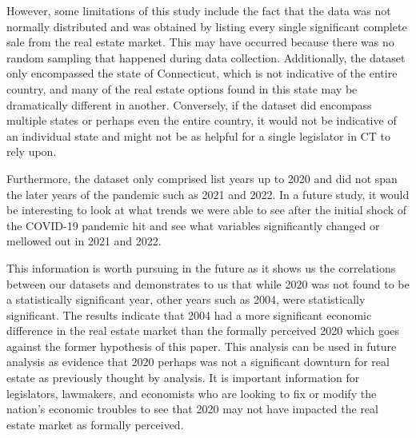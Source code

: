 \documentclass[12pt]{article}
\begin{document}
However, some limitations of this study include the fact that the data was not normally distributed and was obtained by listing every single significant complete sale from the real estate market. This may have occurred because there was no random sampling that happened during data collection. Additionally, the dataset only encompassed the state of Connecticut, which is not indicative of the entire country, and many of the real estate options found in this state may be dramatically different in another. Conversely, if the dataset did encompass multiple states or perhaps even the entire country, it would not be indicative of an individual state and might not be as helpful for a single legislator in CT to rely upon.

Furthermore, the dataset only comprised list years up to 2020 and did not span the later years of the pandemic such as 2021 and 2022. In a future study, it would be interesting to look at what trends we were able to see after the initial shock of the COVID-19 pandemic hit and see what variables significantly changed or mellowed out in 2021 and 2022.

This information is worth pursuing in the future as it shows us the correlations between our datasets and demonstrates to us that while 2020 was not found to be a statistically significant year, other years such as 2004, were statistically significant. The results indicate that 2004 had a more significant economic difference in the real estate market than the formally perceived 2020 which goes against the former hypothesis of this paper. This analysis can be used in future analysis as evidence that 2020 perhaps was not a significant downturn for real estate as previously thought by analysis. It is important information for legislators, lawmakers, and economists who are looking to fix or modify the nation's economic troubles to see that 2020 may not have impacted the real estate market as formally perceived. 


\newpage





\end{document}
